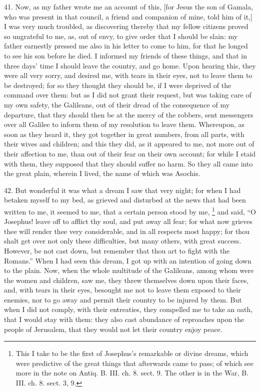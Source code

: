 41. Now, as my father wrote me an account of this, [for Jesus the son of
Gamala, who was present in that council, a friend and companion of mine,
told him of it,] I was very much troubled, as discovering thereby that my
fellow citizens proved so ungrateful to me, as, out of envy, to give order
that I should be slain: my father earnestly pressed me also in his letter
to come to him, for that he longed to see his son before he died. I
informed my friends of these things, and that in three days' time I should
leave the country, and go home. Upon hearing this, they were all very
sorry, and desired me, with tears in their eyes, not to leave them to be
destroyed; for so they thought they should be, if I were deprived of the
command over them: but as I did not grant their request, but was taking
care of my own safety, the Galileans, out of their dread of the
consequence of my departure, that they should then be at the mercy of the
robbers, sent messengers over all Galilee to inform them of my resolution
to leave them. Whereupon, as soon as they heard it, they got together in
great numbers, from all parts, with their wives and children; and this
they did, as it appeared to me, not more out of their affection to me,
than out of their fear on their own account; for while I staid with them,
they supposed that they should suffer no harm. So they all came into the
great plain, wherein I lived, the name of which was Asochis.

42. But wonderful it was what a dream I saw that very night; for when I
had betaken myself to my bed, as grieved and disturbed at the news that
had been written to me, it seemed to me, that a certain person stood by
me, \footnote{This I take to be the
first of Josephus's remarkable or divine dreams, which were predictive of
the great things that afterwards came to pass; of which see more in the
note on Antiq. B. III. ch. 8. sect. 9. The other is in the War, B. III.
ch. 8. sect. 3, 9.}
and said, ``O Josephus! leave off to afflict thy soul, and put away all
fear; for what now grieves thee will render thee very considerable, and in
all respects most happy; for thou shalt get over not only these
difficulties, but many others, with great success. However, be not cast
down, but remember that thou art to fight with the Romans.'' When I had
seen this dream, I got up with an intention of going down to the plain.
Now, when the whole multitude of the Galileans, among whom were the women
and children, saw me, they threw themselves down upon their faces, and,
with tears in their eyes, besought me not to leave them exposed to their
enemies, nor to go away and permit their country to be injured by them.
But when I did not comply, with their entreaties, they compelled me to
take an oath, that I would stay with them: they also cast abundance of
reproaches upon the people of Jerusalem, that they would not let their
country enjoy peace.

